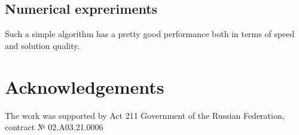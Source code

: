 \documentclass{../download/tPRS2e}
\begin{document}
\subsection{Numerical expreriments}

Such a simple algorithm has a pretty good performance
both in terms of speed and solution quality.

\section*{Acknowledgements}

The work was supported by Act 211 Government of the Russian Federation, contract № 02.A03.21.0006


\nocite{*}

\end{document}
